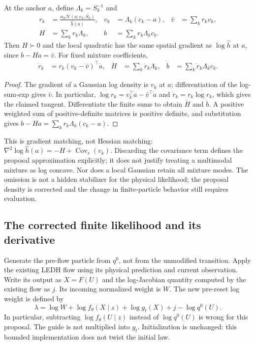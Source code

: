 \begin{proposition}
\label{prop:bg-mixture}
At the anchor $a$, define $\Lambda_k=S_k^{-1}$ and
\begin{align}
 r_k&=\frac{\alpha_k\mathcal N(a;c_k,S_k)}{\widehat h(a)},&
 v_k&=\Lambda_k(c_k-a),& \bar v&=\sum_k r_kv_k,\nonumber\\
 H&=\sum_k r_k\Lambda_k,& b&=\sum_k r_k\Lambda_kc_k.
 \label{eq:bg-mixture}
\end{align}
Then $H\succ0$ and the local quadratic has the same spatial gradient as
$\log\widehat h$ at $a$, since $b-Ha=\bar v$.
For fixed mixture coefficients,
\begin{align}
 \dot r_k&=r_k(v_k-\bar v)^\top\dot a,&
 \dot H&=\sum_k\dot r_k\Lambda_k,&
 \dot b&=\sum_k\dot r_k\Lambda_kc_k.
 \label{eq:bg-mixture-tangent}
\end{align}
\end{proposition}
\begin{proof}
The gradient of a Gaussian log density is $v_k$ at $a$; differentiation of
the log-sum-exp gives $\bar v$. In particular,
$\dot{\log r_k}=v_k^\top\dot a-\bar v^\top\dot a$ and
$\dot r_k=r_k\dot{\log r_k}$, which gives the claimed tangent.
Differentiate the finite sums to obtain $\dot H$ and $\dot b$. A positive
weighted sum of positive-definite matrices is positive definite, and
substitution gives $b-Ha=\sum_k r_k\Lambda_k(c_k-a)$.
\end{proof}
This is gradient matching, not Hessian matching:
$\nabla^2\log\widehat h(a)=-H+\operatorname{Cov}_r(v_k)$.
Discarding the covariance term defines the proposal approximation explicitly;
it does not justify treating a multimodal mixture as log concave. Nor does a
local Gaussian retain all mixture modes. The omission is not a hidden
stabilizer for the physical likelihood; the proposal density is corrected
and the change in finite-particle behavior still requires evaluation.

\subsection{The corrected finite likelihood and its derivative}

Generate the pre-flow particle from $q^0$, not from the unmodified
transition. Apply the existing LEDH flow using its physical prediction and
current observation. Write its output as $X=F(U)$ and the log-Jacobian
quantity computed by the existing flow as $j$. Its incoming normalized
weight is $W$. The new pre-reset log weight is defined by
\begin{equation}
 \lambda=\log W+\log f_\theta(X\mid z)+\log g_t(X)
                 +j-\log q^0(U).
 \label{eq:bg-weight}
\end{equation}
In particular, subtracting $\log f_\theta(U\mid z)$ instead of
$\log q^0(U)$ is wrong for this proposal. The guide is not multiplied into
$g_t$. Initialization is unchanged: this bounded implementation does not
twist the initial law.

